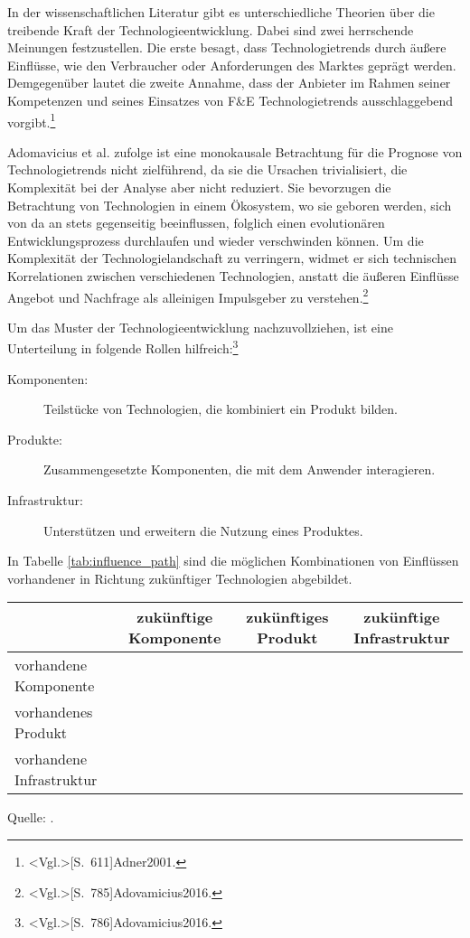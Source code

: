 In der wissenschaftlichen Literatur gibt es unterschiedliche Theorien über die treibende Kraft der Technologieentwicklung. Dabei sind zwei herrschende Meinungen festzustellen. Die erste besagt, dass Technologietrends durch äußere Einflüsse, wie den Verbraucher oder Anforderungen des Marktes geprägt werden. Demgegenüber lautet die zweite Annahme, dass der Anbieter im Rahmen seiner Kompetenzen und seines Einsatzes von F\&E Technologietrends ausschlaggebend vorgibt.\footnote{\citeNP<Vgl.>[S.~611]{Adner2001}.}

Adomavicius et al. zufolge ist eine monokausale Betrachtung für die Prognose von Technologietrends nicht zielführend, da sie die Ursachen trivialisiert, die Komplexität bei der Analyse aber nicht reduziert. Sie bevorzugen die Betrachtung von Technologien in einem Ökosystem, wo sie geboren werden, sich von da an stets gegenseitig beeinflussen, folglich einen evolutionären Entwicklungsprozess durchlaufen und wieder verschwinden können. Um die Komplexität der Technologielandschaft zu verringern, widmet er sich technischen Korrelationen zwischen verschiedenen Technologien, anstatt die äußeren Einflüsse Angebot und Nachfrage als alleinigen Impulsgeber zu verstehen.\footnote{\citeNP<Vgl.>[S.~785]{Adovamicius2016}.}

Um das Muster der Technologieentwicklung nachzuvollziehen, ist eine Unterteilung in folgende Rollen hilfreich:\footnote{\citeNP<Vgl.>[S.~786]{Adovamicius2016}.}
\begin{description}
	\item[Komponenten:] Teilstücke von Technologien, die kombiniert ein Produkt bilden.
	\item[Produkte:] Zusammengesetzte Komponenten, die mit dem Anwender interagieren.
	\item[Infrastruktur:] Unterstützen und erweitern die Nutzung eines Produktes.
\end{description}

In Tabelle \ref{tab:influence_path} sind die möglichen Kombinationen von Einflüssen vorhandener in Richtung zukünftiger Technologien abgebildet.

\begin{center}
\label{tab:influence_path}
\begin{tabulary}{\textwidth}{|L|C|C|C|}
	\hline
	 & zukünftige Komponente & zukünftiges Produkt & zukünftige Infrastruktur \\ 
	\hline 
	vorhandene Komponente &  &  &  \\ 
	\hline 
	vorhandenes Produkt &  &  &  \\ 
	\hline 
	vorhandene Infrastruktur &  &  &  \\ 
	\hline 
\end{tabulary}\par
\bigskip
\bigskip
Quelle: .
\end{center}


